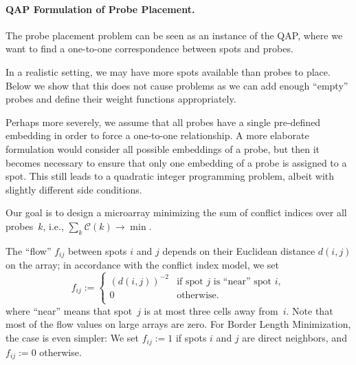 \documentclass[english]{lni}
\newcommand{\ignore}[1]{}
\begin{document}
\paragraph{QAP Formulation of Probe Placement.}
The probe placement problem can be seen as an instance of the QAP, where we
want to find a one-to-one correspondence between spots and probes.
\ignore{
To
formulate it, we use the facility location example by viewing the probes as
locations and the spots as facilities, i.e., the spots are assigned to the
probes. In this case the flow matrix $F$ contains the ``closeness'' values
between spots, and the distance matrix $D$ contains the (weighted) Hamming
distances between probe embeddings.  We first give the general formulation for
conflict index; the case of border length minimization is obtained by using
the particular weight functions given at the end of
Section~\ref{sec:model}.
}
In a realistic setting, we may have more spots available than probes
to place. Below we show that this does not cause problems as we can add enough
``empty'' probes and define their weight functions appropriately.

Perhaps more severely, we assume that all probes have a single pre-defined
embedding in order to force a one-to-one relationship.  A more elaborate
formulation would consider all possible embeddings of a probe, but then it
becomes necessary to ensure that only one embedding of a probe is assigned to
a spot. This still leads to a quadratic integer programming problem, albeit
with slightly different side conditions.

Our goal is to design a microarray minimizing the sum of conflict indices over
all probes~$k$, i.e., $\sum_{k} \mathcal{C}(k) \to \min$.

The ``flow'' $f_{ij}$ between spots $i$ and $j$ depends on their Euclidean distance
$d(i,j)$ on the array; in accordance with the conflict index model, we set
\begin{equation}
  f_{ij} := \left\{ \begin{array}{ll}
      (d(i,j))^{-2} & \mbox{if spot $j$ is ``near'' spot $i$}, \\
      0 & \mbox{otherwise}. \\
    \end{array} \right.
\end{equation}
where ``near'' means that spot~$j$ is at most three cells away from~$i$. Note
that most of the flow values on large arrays are zero. For Border Length
Minimization, the case is even simpler: We set $f_{ij}:=1$ if spots $i$ and
$j$ are direct neighbors, and $f_{ij}:=0$ otherwise.
\end{document}
